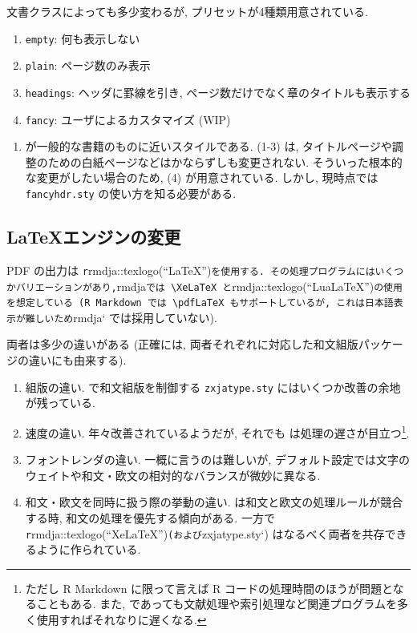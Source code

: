 \documentclass[
  xelatex,ja=standard,jafont=noto]{bxjsbook}
\providecommand{\tightlist}{%
  \setlength{\itemsep}{0pt}\setlength{\parskip}{0pt}}
\theoremstyle{definition}
\theoremstyle{definition}
\theoremstyle{definition}
\theoremstyle{definition}
\theoremstyle{remark}
\begin{document}
文書クラスによっても多少変わるが, プリセットが4種類用意されている.

\begin{enumerate}
\def\labelenumi{\arabic{enumi}.}
\tightlist
\item
  \texttt{empty}: 何も表示しない
\item
  \texttt{plain}: ページ数のみ表示
\item
  \texttt{headings}: ヘッダに罫線を引き,
  ページ数だけでなく章のタイトルも表示する
\item
  \texttt{fancy}: ユーザによるカスタマイズ (WIP)
\end{enumerate}

\begin{enumerate}
\def\labelenumi{(\arabic{enumi})}
\setcounter{enumi}{2}
\tightlist
\item
  が一般的な書籍のものに近いスタイルである. (1-3) は,
  タイトルページや調整のための白紙ページなどはかならずしも変更されない.
  そういった根本的な変更がしたい場合のため, (4) が用意されている.
  しかし, 現時点では \texttt{fancyhdr.sty} の使い方を知る必要がある.
\end{enumerate}

\hypertarget{ux30a8ux30f3ux30b8ux30f3ux306eux5909ux66f4}{%
\subsection{\texorpdfstring{\LaTeX エンジンの変更}{エンジンの変更}}\label{ux30a8ux30f3ux30b8ux30f3ux306eux5909ux66f4}}

PDF の出力は
\texttt{r}rmdja::texlogo(``LaTeX'')\texttt{を使用する.\ その処理プログラムにはいくつかバリエーションがあり,}rmdja\texttt{では\ \textbackslash{}XeLaTeX\ と}rmdja::texlogo(``LuaLaTeX'')\texttt{の使用を想定している\ (R\ Markdown\ では\ \textbackslash{}pdfLaTeX\ もサポートしているが,\ これは日本語表示が難しいため}rmdja`
では採用していない).

両者は多少の違いがある (正確には,
両者それぞれに対応した和文組版パッケージの違いにも由来する).

\begin{enumerate}
\def\labelenumi{\arabic{enumi}.}
\tightlist
\item
  組版の違い. \XeLaTeX で和文組版を制御する \texttt{zxjatype.sty}
  にはいくつか改善の余地が残っている.
\item
  速度の違い. 年々改善されているようだが, それでも
  \LuaLaTeX は処理の遅さが目立つ\footnote{ただし R Markdown
    に限って言えば R コードの処理時間のほうが問題となることもある. また,
    \XeLaTeX であっても文献処理や索引処理など関連プログラムを多く使用すればそれなりに遅くなる.}.
\item
  フォントレンダの違い. 一概に言うのは難しいが,
  デフォルト設定では文字のウェイトや和文・欧文の相対的なバランスが微妙に異なる.
\item
  和文・欧文を同時に扱う際の挙動の違い.
  \LuaLaTeX は和文と欧文の処理ルールが競合する時,
  和文の処理を優先する傾向がある. 一方で
  \texttt{r}rmdja::texlogo(``XeLaTeX'')\texttt{(および}zxjatype.sty`)
  はなるべく両者を共存できるように作られている.
\end{enumerate}
\end{document}

